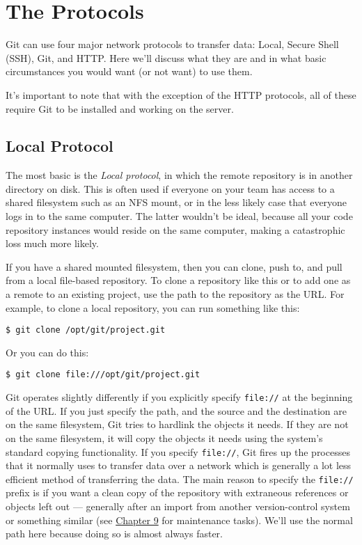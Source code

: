 \documentclass[a4paper]{book}
\newcommand{\prechap}{Chapter }
\newcommand{\postchap}{}
\newcommand{\chapref}[1]{\hyperref[chap:#1]{\prechap #1\postchap}}
\begin{document}
\section{The Protocols}\label{the-protocols}

Git can use four major network protocols to transfer data: Local, Secure Shell (SSH), Git, and HTTP. Here we'll discuss what they are and in what basic circumstances you would want (or not want) to use them.

It's important to note that with the exception of the HTTP protocols, all of these require Git to be installed and working on the server.

\subsection{Local Protocol}\label{local-protocol}

The most basic is the \emph{Local protocol}, in which the remote repository is in another directory on disk. This is often used if everyone on your team has access to a shared filesystem such as an NFS mount, or in the less likely case that everyone logs in to the same computer. The latter wouldn't be ideal, because all your code repository instances would reside on the same computer, making a catastrophic loss much more likely.

If you have a shared mounted filesystem, then you can clone, push to, and pull from a local file-based repository. To clone a repository like this or to add one as a remote to an existing project, use the path to the repository as the URL. For example, to clone a local repository, you can run something like this:

\begin{shaded}\begin{verbatim}
$ git clone /opt/git/project.git
\end{verbatim}\end{shaded}

Or you can do this:

\begin{shaded}\begin{verbatim}
$ git clone file:///opt/git/project.git
\end{verbatim}\end{shaded}

Git operates slightly differently if you explicitly specify \texttt{file://} at the beginning of the URL. If you just specify the path, and the source and the destination are on the same filesystem, Git tries to hardlink the objects it needs. If they are not on the same filesystem, it will copy the objects it needs using the system's standard copying functionality. If you specify \texttt{file://}, Git fires up the processes that it normally uses to transfer data over a network which is generally a lot less efficient method of transferring the data. The main reason to specify the \texttt{file://} prefix is if you want a clean copy of the repository with extraneous references or objects left out --- generally after an import from another version-control system or something similar (see \chapref{9} for maintenance tasks). We'll use the normal path here because doing so is almost always faster.
\end{document}
